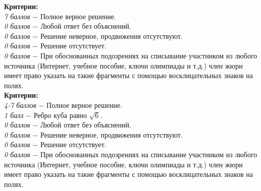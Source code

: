  \textbf{Критерии:} \\
\textit{7 баллов} $-$ Полное верное решение.\\
\textit{0 баллов} $-$ Любой ответ без объяснений.\\
\textit{0 баллов} $-$ Решение неверное, продвижения отсутствуют.\\
\textit{0 баллов} $-$ Решение отсутствует.\\
\textit{0 баллов} $-$ При обоснованных подозрениях на списывание участником из любого источника (Интернет, учебное пособие, ключи олимпиады и т.д.) член жюри имеет право указать на такие фрагменты с помощью восклицательных знаков на полях. \\

 \textbf{Критерии:} \\
\textit{4-7 баллов} $-$ Полное верное решение.\\
\textit{1 балл} $-$ Ребро куба равно $\sqrt{6}$.\\
\textit{0 баллов} $-$ Любой ответ без объяснений.\\
\textit{0 баллов} $-$ Решение неверное, продвижения отсутствуют.\\
\textit{0 баллов} $-$ Решение отсутствует.\\
\textit{0 баллов} $-$ При обоснованных подозрениях на списывание участником из любого источника (Интернет, учебное пособие, ключи олимпиады и т.д.) член жюри имеет право указать на такие фрагменты с помощью восклицательных знаков на полях. \\